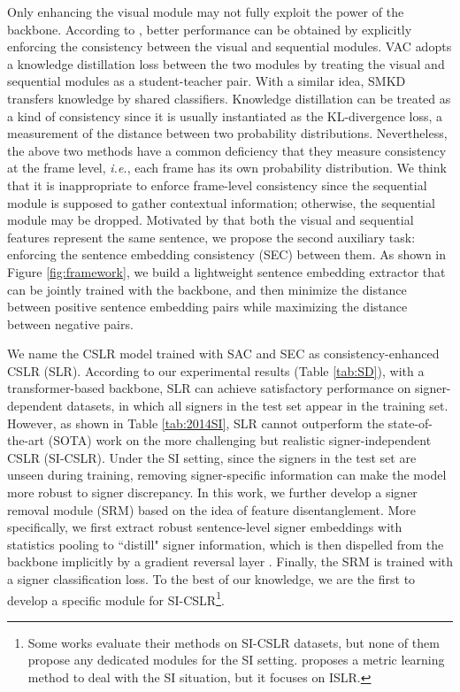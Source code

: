 \documentclass[acmsmall,screen]{acmart}
\def\ie{\emph{i.e.}} \def\Ie{\emph{I.e.}}
\begin{document}
Only enhancing the visual module may not fully exploit the power of the backbone.
According to \cite{vac, self-mutual}, better performance can be obtained by explicitly enforcing the consistency between the visual and sequential modules.
VAC \cite{vac} adopts a knowledge distillation loss between the two modules by treating the visual and sequential modules as a student-teacher pair.
With a similar idea, SMKD \cite{self-mutual} transfers knowledge by shared classifiers.
Knowledge distillation can be treated as a kind of consistency since it is usually instantiated as the KL-divergence loss, a measurement of the distance between two probability distributions.
Nevertheless, the above two methods have a common deficiency that they measure consistency at the frame level, \ie, each frame has its own probability distribution.
We think that it is inappropriate to enforce frame-level consistency since the sequential module is supposed to gather contextual information; otherwise, the sequential module may be dropped.
Motivated by that both the visual and sequential features represent the same sentence, we propose the second auxiliary task: enforcing the sentence embedding consistency (SEC) between them.
As shown in Figure \ref{fig:framework}, we build a lightweight sentence embedding extractor that can be jointly trained with the backbone, and then minimize the distance between positive sentence embedding pairs while maximizing the distance between negative pairs.

We name the CSLR model trained with SAC and SEC as consistency-enhanced CSLR (SLR).
According to our experimental results (Table \ref{tab:SD}), with a transformer-based backbone, SLR can achieve satisfactory performance on signer-dependent datasets, in which all signers in the test set appear in the training set.
However, as shown in Table \ref{tab:2014SI}, SLR cannot outperform the state-of-the-art (SOTA) work on the more challenging but realistic signer-independent CSLR (SI-CSLR).
Under the SI setting, since the signers in the test set are unseen during training, removing signer-specific information can make the model more robust to signer discrepancy.
In this work, we further develop a signer removal module (SRM) based on the idea of feature disentanglement.
More specifically, we first extract robust sentence-level signer embeddings with statistics pooling \cite{snyder2018x} to ``distill" signer information, which is then dispelled from the backbone implicitly by a gradient reversal layer \cite{ganin2016domain}.
Finally, the SRM is trained with a signer classification loss.
To the best of our knowledge, we are the first to develop a specific module for SI-CSLR\footnote{Some works \cite{dnf, cma} evaluate their methods on SI-CSLR datasets, but none of them propose any dedicated modules for the SI setting. \cite{yin2016iterative} proposes a metric learning method to deal with the SI situation, but it focuses on ISLR.}.
\end{document}
